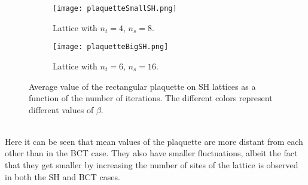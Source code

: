 \begin{figure}[!htbp]
    \centering
    \begin{subfigure}[b]{0.49\textwidth}
        \texttt{[image: plaquetteSmallSH.png]}
        \caption{Lattice with $n_t=4$, $n_s=8$.}
        \label{4F:PlaqIterSmallSH}
    \end{subfigure}
    \begin{subfigure}[b]{0.49\textwidth}
        \texttt{[image: plaquetteBigSH.png]}
        \caption{Lattice with $n_t=6$, $n_s=16$.}
        \label{4F:PlaqIterBigSH}
    \end{subfigure}
    \caption{Average value of the rectangular plaquette on SH lattices as a function of the number of iterations. The different colors represent different values of $\beta$.}
    \label{4F:PlaqIterSH}
\end{figure}\\
Here it can be seen that mean values of the plaquette are more distant from each other than in the BCT case.
They also have smaller fluctuations, albeit the fact that they get smaller by increasing the number of sites of the lattice is observed in both the SH and BCT cases.

